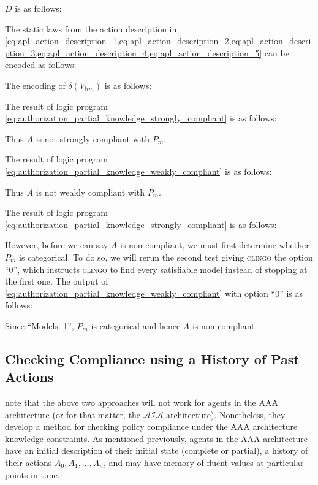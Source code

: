 $D$ is as follows:


The static laws from the action description in \cref{eq:apl_action_description_1,eq:apl_action_description_2,eq:apl_action_description_3,eq:apl_action_description_4,eq:apl_action_description_5} can be encoded as follows:


The encoding of $\delta(V_{lim})$ is as follows:


%

The result of logic program \cref{eq:authorization_partial_knowledge_strongly_compliant} is as follows:

Thus $A$ is not strongly compliant with $P_m$.

The result of logic program \cref{eq:authorization_partial_knowledge_weakly_compliant} is as follows:

Thus $A$ is not weakly compliant with $P_m$.

The result of logic program \cref{eq:authorization_partial_knowledge_strongly_compliant} is as follows:

However, before we can say $A$ is non-compliant, we must first determine whether $P_m$ is categorical.
To do so, we will rerun the second test giving \textsc{clingo} the option ``0'', which instructs \textsc{clingo} to find every satisfiable model instead of stopping at the first one.
The output of \cref{eq:authorization_partial_knowledge_weakly_compliant} with option ``0'' is as follows:

Since ``Models: 1'', $P_m$ is categorical and hence $A$ is non-compliant.

\subsection{Checking Compliance using a History of Past Actions}

\citet{gelfond_authorization_2008} note that the above two approaches will not work for agents in the AAA architecture (or for that matter, the $\mathcal{AIA}$ architecture).
Nonetheless, they develop a method for checking policy compliance under the AAA architecture knowledge constraints.
As mentioned previously, agents in the AAA architecture have an initial description of their initial state (complete or partial), a history of their actions $A_0, A_1, \dots, A_n$, and may have memory of fluent values at particular points in time.

